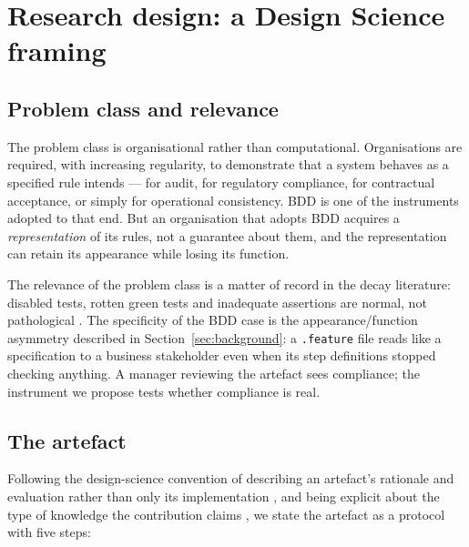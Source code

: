 \section{Research design: a Design Science framing}
\label{sec:design}

\subsection{Problem class and relevance}

The problem class is organisational rather than computational. Organisations are required, with
increasing regularity, to demonstrate that a system behaves as a specified rule intends --- for audit,
for regulatory compliance, for contractual acceptance, or simply for operational consistency. BDD is
one of the instruments adopted to that end. But an organisation that adopts BDD acquires a
\emph{representation} of its rules, not a guarantee about them, and the representation can retain its
appearance while losing its function.

The relevance of the problem class is a matter of record in the decay literature: disabled tests,
rotten green tests and inadequate assertions are normal, not pathological
\citep{Kim2021Disabled,Delplanque2019RottenGreen,zhi2013inadequateassertions}. The specificity of the
BDD case is the appearance/function asymmetry described in Section~\ref{sec:background}: a
\texttt{.feature} file reads like a specification to a business stakeholder even when its step
definitions stopped checking anything. A manager reviewing the artefact sees compliance; the
instrument we propose tests whether compliance is real.

\subsection{The artefact}

Following the design-science convention of describing an artefact's rationale and evaluation rather
than only its implementation \citep{hevner2004design,peffers2007dsrm}, and being explicit about the type
of knowledge the contribution claims \citep{gregor2013positioning}, we state the artefact as a protocol
with five steps:


